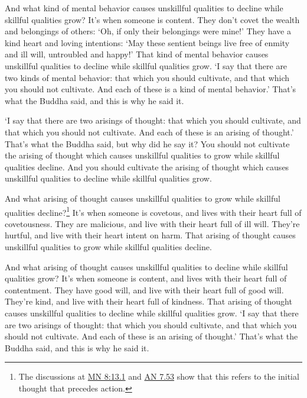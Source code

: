 \documentclass[12pt,openany]{book}%
\begin{document}
And what kind of mental behavior causes unskillful qualities to decline while skillful qualities grow? It’s when someone is content. They don’t covet the wealth and belongings of others: ‘Oh, if only their belongings were mine!’ They have a kind heart and loving intentions: ‘May these sentient beings live free of enmity and ill will, untroubled and happy!’ That kind of mental behavior causes unskillful qualities to decline while skillful qualities grow. ‘I say that there are two kinds of mental behavior: that which you should cultivate, and that which you should not cultivate. And each of these is a kind of mental behavior.’ That’s what the Buddha said, and this is why he said it. 

‘I say that there are two arisings of thought: that which you should cultivate, and that which you should not cultivate. And each of these is an arising of thought.’ That’s what the Buddha said, but why did he say it? You should not cultivate the arising of thought which causes unskillful qualities to grow while skillful qualities decline. And you should cultivate the arising of thought which causes unskillful qualities to decline while skillful qualities grow. 

And what arising of thought causes unskillful qualities to grow while skillful qualities decline?\footnote{The discussions at \href{https://suttacentral.net/mn8/en/sujato\#13.1}{MN 8:13.1} and \href{https://suttacentral.net/an7.53/en/sujato}{AN 7.53} show that this refers to the initial thought that precedes action. } It’s when someone is covetous, and lives with their heart full of covetousness. They are malicious, and live with their heart full of ill will. They’re hurtful, and live with their heart intent on harm. That arising of thought causes unskillful qualities to grow while skillful qualities decline. 

And what arising of thought causes unskillful qualities to decline while skillful qualities grow? It’s when someone is content, and lives with their heart full of contentment. They have good will, and live with their heart full of good will. They’re kind, and live with their heart full of kindness. That arising of thought causes unskillful qualities to decline while skillful qualities grow. ‘I say that there are two arisings of thought: that which you should cultivate, and that which you should not cultivate. And each of these is an arising of thought.’ That’s what the Buddha said, and this is why he said it. 
\end{document}
